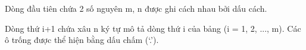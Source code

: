 Dòng đầu tiên chứa 2 số nguyên m, n được ghi cách nhau bởi dấu cách.

Dòng thứ i+1 chứa xâu n ký tự mô tả dòng thứ i của bảng (i = 1, 2, ..., m). Các ô trống được thể hiện bằng dấu chấm (‘.’).